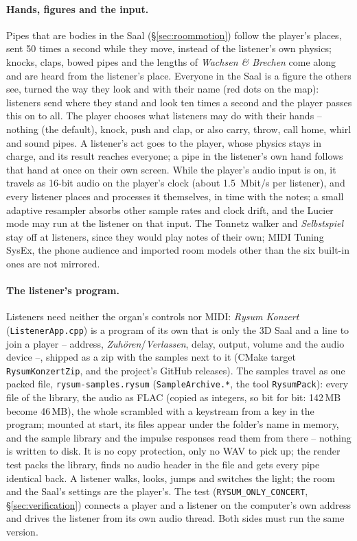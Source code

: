 \documentclass[11pt,a4paper,parskip=half,DIV=11,toc=bibliography]{scrartcl}
\newcommand{\ui}[1]{\emph{#1}}                 %
\newcommand{\code}[1]{\texttt{#1}}
\newcommand{\fn}[1]{\mbox{\texttt{#1}}}
\begin{document}
\paragraph{Hands, figures and the input.} Pipes that are bodies in the Saal (\S\ref{sec:roommotion}) follow the player's places, sent 50 times a second
while they move, instead of the listener's own physics; knocks, claps, bowed pipes and the lengths of \ui{Wachsen \& Brechen} come along and are heard from
the listener's place. Everyone in the Saal is a figure the others see, turned the way they look and with their name (red dots on the map): listeners send
where they stand and look ten times a second and the player passes this on to all. The player chooses what listeners may do with their hands --
nothing (the default), knock, push and clap, or also carry, throw, call home, whirl and sound pipes. A listener's act goes to the player, whose physics
stays in charge, and its result reaches everyone; a pipe in the listener's own hand follows that hand at once on their own screen. While the player's audio
input is on, it travels as 16-bit audio on the player's clock (about \SI{1.5}{Mbit/s} per listener), and every listener places and processes it
themselves, in time with the notes; a small adaptive resampler absorbs other sample rates and clock drift, and the Lucier mode may run at the listener on
that input. The Tonnetz walker and \ui{Selbstspiel} stay off at listeners, since they would play notes of their own; MIDI Tuning SysEx, the phone
audience and imported room models other than the six built-in ones are not mirrored.

\paragraph{The listener's program.} Listeners need neither the organ's controls nor MIDI: \emph{Rysum Konzert} (\fn{ListenerApp.cpp}) is a program of its
own that is only the 3D Saal and a line to join a player -- address, \ui{Zuhören}/\ui{Verlassen}, delay, output, volume and the audio device --, shipped as a
zip with the samples next to it (CMake target \fn{RysumKonzertZip}, and the project's GitHub releases). The samples travel as one packed file,
\fn{rysum-samples.rysum} (\fn{SampleArchive.*}, the tool \fn{RysumPack}): every file of the library, the audio as FLAC (copied as integers, so bit for
bit: 142\,MB become 46\,MB), the whole scrambled with a keystream from a key in the program; mounted at start, its files appear under the folder's name in
memory, and the sample library and the impulse responses read them from there -- nothing is written to disk. It is no copy protection, only no WAV to
pick up; the render test packs the library, finds no audio header in the file and gets every pipe identical back. A listener walks, looks, jumps and switches the light; the room and the Saal's
settings are the player's. The test (\code{RYSUM\_ONLY\_CONCERT}, \S\ref{sec:verification}) connects a player and a listener on the computer's own
address and drives the listener from its own audio thread. Both sides must run the same version.
\end{document}
